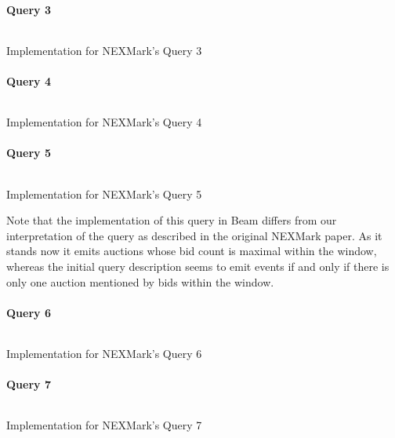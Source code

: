 \paragraph{Query 3}
\begin{listing}[H]
  \inputminted[firstline=492,lastline=501]{rust}{benchmarks/src/nexmark.rs}
  \caption{Implementation for NEXMark's Query 3}
  \label{lst:nexmark-query3}
\end{listing}

\paragraph{Query 4}
\begin{listing}[H]
  \inputminted[firstline=533,lastline=535]{rust}{benchmarks/src/nexmark.rs}
  \caption{Implementation for NEXMark's Query 4}
  \label{lst:nexmark-query4}
\end{listing}

\paragraph{Query 5}
\begin{listing}[H]
  \inputminted[firstline=564,lastline=573]{rust}{benchmarks/src/nexmark.rs}
  \caption{Implementation for NEXMark's Query 5}
  \label{lst:nexmark-query5}
\end{listing}

Note that the implementation of this query in Beam differs from our interpretation of the query as described in the original NEXMark paper. As it stands now it emits auctions whose bid count is maximal within the window, whereas the initial query description seems to emit events if and only if there is only one auction mentioned by bids within the window.

\paragraph{Query 6}
\begin{listing}[H]
  \inputminted[firstline=605,lastline=606]{rust}{benchmarks/src/nexmark.rs}
  \caption{Implementation for NEXMark's Query 6}
  \label{lst:nexmark-query6}
\end{listing}

\paragraph{Query 7}
\begin{listing}[H]
  \inputminted[firstline=640,lastline=646]{rust}{benchmarks/src/nexmark.rs}
  \caption{Implementation for NEXMark's Query 7}
  \label{lst:nexmark-query7}
\end{listing}

